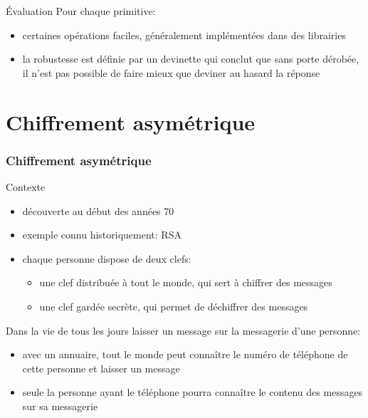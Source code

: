 \begin{reveals}
\begin{frame}
  \vfill

  \begin{block}{Évaluation}
    Pour chaque primitive:
    \begin{itemize}
    \item certaines opérations faciles, généralement implémentées dans
      des librairies
    \item la robustesse est définie par un devinette qui conclut que sans
      porte dérobée, il n'est pas possible de faire mieux que deviner
      au hasard la réponse
    \end{itemize}
  \end{block}

  \vfill

\end{frame}

\section{Chiffrement asymétrique}


\begin{frame}
  \frametitle{Chiffrement asymétrique}

  \vfill
  
  \begin{block}{Contexte}
    \begin{itemize}
    \item découverte au début des années 70
    \item exemple connu historiquement: RSA
    \item chaque personne dispose de deux clefs:
      \begin{itemize}
      \item une clef distribuée à tout le monde, qui sert à chiffrer des messages
      \item une clef gardée secrète, qui permet de déchiffrer des messages
      \end{itemize}
    \end{itemize}
  \end{block}
  
  \vfill

  \begin{block}{Dans la vie de tous les jours}
    laisser un message sur la messagerie d'une personne:
    \begin{itemize}
    \item avec un annuaire, tout le monde peut connaître le numéro de
      téléphone de cette personne et laisser un message
    \item seule la personne ayant le téléphone pourra connaître le
      contenu des messages sur sa messagerie
    \end{itemize}
  \end{block}


\end{frame}
\end{reveals}
